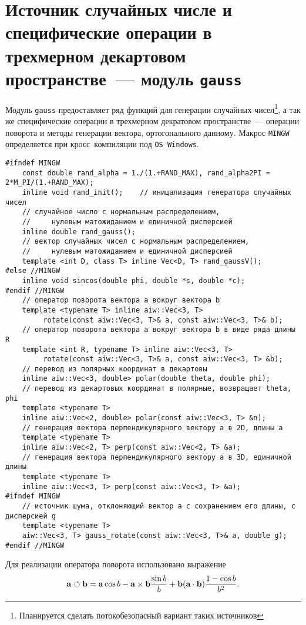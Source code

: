 \def\rotop{\circlearrowleft}
\def\vctr3#1#2#3{\left(\begin{matrix}{#1}\\{#2}\\{#3}\end{matrix}\right)}
\def\mstyle{\scriptstyle}
\def\dmdt#1{{\dfdx{^{#1}\m}{t^{#1}}}}
\def\dfdx#1#2{\frac{\partial #1}{\partial #2}}

\section{Источник случайных числе и специфические операции в трехмерном декартовом пространстве~--- модуль {\tt gauss}}\label{gauss:sec}
Модуль \verb'gauss' предоставляет ряд функций для генерации случайных чисел\footnote{Планируется сделать потокобезопасный вариант таких источников},
а так же специфические операции в трехмерном декратовом пространстве~---
операции поворота и методы генерации вектора, ортогонального данному. Макрос \verb'MINGW' определяется при кросс--компиляции под \verb'OS Windows'.
\begin{verbatim}
#ifndef MINGW
    const double rand_alpha = 1./(1.+RAND_MAX), rand_alpha2PI = 2*M_PI/(1.+RAND_MAX);
    inline void rand_init();    // иницализация генератора случайных чисел
    // случайное число с нормальным распределением, 
    //     нулевым матожиданием и единичной дисперсией
    inline double rand_gauss(); 
    // вектор случайных чисел с нормальным распределением,
    //     нулевым матожиданием и единичной дисперсией
    template <int D, class T> inline Vec<D, T> rand_gaussV(); 
#else //MINGW
    inline void sincos(double phi, double *s, double *c);
#endif //MINGW
    // оператор поворота вектора a вокруг вектора b
    template <typename T> inline aiw::Vec<3, T> 
         rotate(const aiw::Vec<3, T>& a, const aiw::Vec<3, T>& b);
    // оператор поворота вектора a вокруг вектора b в виде ряда длины R
    template <int R, typename T> inline aiw::Vec<3, T> 
         rotate(const aiw::Vec<3, T>& a, const aiw::Vec<3, T> &b);
    // перевод из полярных координат в декартовы
	inline aiw::Vec<3, double> polar(double theta, double phi);
    // перевод из декартовых координат в полярные, возвращает theta, phi
    template <typename T> 
    inline aiw::Vec<2, double> polar(const aiw::Vec<3, T> &n);
    // генерация вектора перпендикулярного вектору a в 2D, длины a
    template <typename T> 
    inline aiw::Vec<2, T> perp(const aiw::Vec<2, T> &a);
    // генерация вектора перпендикулярного вектору a в 3D, единичной длины 
    template <typename T> 
    inline aiw::Vec<3, T> perp(const aiw::Vec<3, T> &a);
#ifndef MINGW
    // источник шума, отклоняющий вектор a с сохранением его длины, с дисперсией g
    template <typename T> 
    aiw::Vec<3, T> gauss_rotate(const aiw::Vec<3, T>& a, double g);
#endif //MINGW
\end{verbatim}
Для реализации оператора поворота использовано выражение
$$
\a\rotop\b = \a\cos b - \a\times\b \frac{\sin b}{b} + \b (\a\cdot\b)\frac{1-\cos b}{b^2}.
$$

